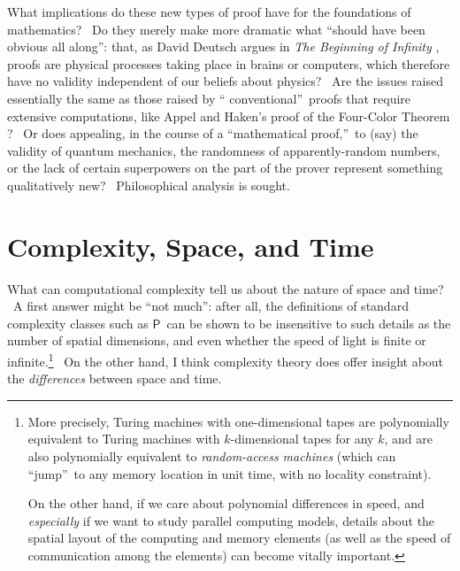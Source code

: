 \documentclass[12pt,onecolumn]{article}%
\begin{document}
What implications do these new types of proof have for the foundations of
mathematics? \ Do they merely make more dramatic what \textquotedblleft should
have been obvious all along\textquotedblright: that, as David Deutsch argues
in \textit{The Beginning of Infinity} \cite{deutsch:infinity}, proofs are
physical processes taking place in brains or computers, which therefore have
no validity independent of our beliefs about physics? \ Are the issues raised
essentially the same as those raised by \textquotedblleft
conventional\textquotedblright\ proofs that require extensive computations,
like Appel and Haken's proof of the Four-Color Theorem \cite{appelhaken}? \ Or
does appealing, in the course of a \textquotedblleft mathematical
proof,\textquotedblright\ to (say) the validity of quantum mechanics, the
randomness of apparently-random numbers, or the lack of certain superpowers on
the part of the prover represent something qualitatively new? \ Philosophical
analysis is sought.

\section{Complexity, Space, and Time\label{TIME}}

What can computational complexity tell us about the nature of space and time?
\ A first answer might be \textquotedblleft not much\textquotedblright: after
all, the definitions of standard complexity classes such as $\mathsf{P}$\ can
be shown to be insensitive to such details as the number of spatial
dimensions, and even whether the speed of light is finite or
infinite.\footnote{More precisely, Turing machines with one-dimensional tapes
are polynomially equivalent to Turing machines with $k$-dimensional tapes for
any $k$, and are also polynomially equivalent to \textit{random-access
machines} (which can \textquotedblleft jump\textquotedblright\ to any memory
location in unit time, with no locality constraint).
\par
On the other hand, if we care about polynomial differences in speed, and
\textit{especially} if we want to study parallel computing models, details
about the spatial layout of the computing and memory elements (as well as the
speed of communication among the elements) can become vitally important.} \ On
the other hand, I think complexity theory does offer insight about the
\textit{differences} between space and time.
\end{document}
